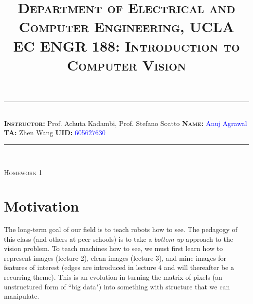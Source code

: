 \documentclass[answers]{exam}
\title{\normalfont \normalsize
\textsc{{Department of Electrical and Computer Engineering, UCLA \\
EC ENGR 188: Introduction to Computer Vision}}
\date{\vspace{-12ex}}
}
\newcommand{\myinput}[1]{\textcolor{blue}{#1}}
\begin{document}
\maketitle
\rule{\linewidth}{0.8pt} \\[6pt] 
\noindent
\large\textbf{\textsc{Instructor:}} Prof. Achuta Kadambi, Prof. Stefano Soatto \hfill \large\textbf{\textsc{Name:}} \myinput{Anuj Agrawal}\\
\large\textbf{\textsc{TA:}} Zhen Wang \hfill 
\large\textbf{\textsc{UID:}} \myinput{605627630}
\rule{\linewidth}{0.8pt} \\[6pt] 

\begin{center}
{\textsc{Homework 1}} 
\end{center}


\begin{table}[h]
\centering
{}
\caption*{}
\label{}
\end{table}
\section*{Motivation}

The long-term goal of our field is to teach robots how to see. The pedagogy of this class (and others at peer schools) is to take a \emph{bottom-up} approach to the vision problem. To teach machines how to see, we must first learn how to represent images (lecture 2), clean images (lecture 3), and mine images for features of interest (edges are introduced in lecture 4 and will thereafter be a recurring theme). This is an evolution in turning the  matrix of pixels (an unstructured form of ``big data") into something with structure that we can manipulate.
\end{document}

